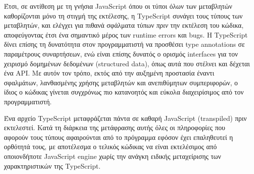 \documentclass[../thesis.tex]{subfiles}
\begin{document}
Έτσι, σε αντίθεση με τη γνήσια JavaScript όπου οι τύποι όλων των μεταβλητών καθορίζονται μόνο τη στιγμή της εκτέλεσης, η TypeScript συνάγει τους τύπους των μεταβλητών, και ελέγχει για πιθανά σφάλματα τύπων \textit{πριν} την εκτέλεση του κώδικα, αποφεύγοντας έτσι ένα σημαντικό μέρος των runtime errors και bugs\cite{tsMozilla}.
Η TypeScript δίνει επίσης τη δυνατότητα στον προγραμματιστή να προσθέσει type annotations σε παραμέτρους συναρτήσεων, ενώ είναι επίσης δυνατός ο ορισμός interfaces για τον χειρισμό δομημένων δεδομένων (structured data), όπως αυτά που στέλνει και δέχεται ένα API.
Με αυτόν τον τρόπο, εκτός από την αυξημένη προστασία έναντι σφαλμάτων, λανθασμένης χρήσης μεταβλητών και ανεπιθύμητων συμπεριφορών, ο ίδιος ο κώδικας γίνεται συγχρόνως πιο κατανοητός και εύκολα διαχειρίσιμος από τον προγραμματιστή.

Ένα αρχείο TypeScript μεταφράζεται πάντα σε καθαρή JavaScript (transpiled) πριν εκτελεστεί.
Κατά τη διάρκεια της μετάφρασης αυτής όλες οι πληροφορίες που αφορούν τους τύπους αφαιρούνται από το πρόγραμμα εφόσον έχει επαληθευτεί η ορθότητά τους, με αποτέλεσμα ο τελικός κώδικας να είναι εκτελέσιμος από οποιονδήποτε JavaScript engine χωρίς την ανάγκη ειδικής μεταχείρισης των χαρακτηριστικών της TypeScript.
\end{document}
